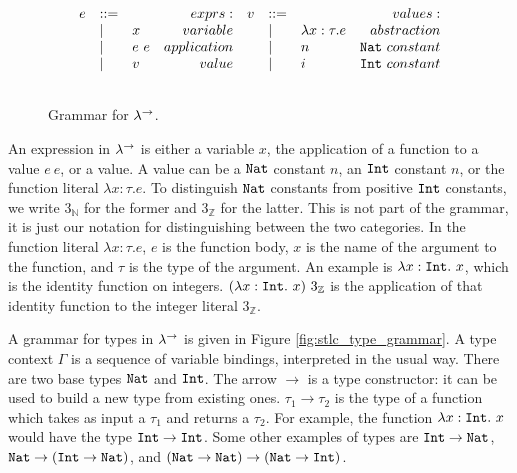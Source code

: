 \begin{figure}[h]
\vspace{-5pt}

\[
\begin{array}{lll}

\begin{array}{lllr}

e & ::= & ~ & exprs: \\
	& | & x & variable \\
	& | & e~e & application \\
	& | & v & value \\
	&&\\
	
\end{array}

\begin{array}{lllr}

v & ::= & ~ & values: \\
	& | & \lambda x: \tau . e & abstraction \\
	& | & n & \mathtt{Nat}~constant \\
	& | & i & \mathtt{Int}~constant \\
	&&\\
	
\end{array}

\end{array}
\]

\vspace{-12pt}
\caption{Grammar for $\lambda^{\rightarrow}$.}
\label{fig:stlc_grammar}
\end{figure}

An expression in $\lambda^{\rightarrow}$ is either a variable $x$, the application of a function to a value $e~e$, or a value. A value can be a $\mathtt{Nat}$ constant $n$, an $\mathtt{Int}$ constant $n$, or the function literal $\lambda x: \tau.e$. To distinguish $\mathtt{Nat}$ constants from positive $\mathtt{Int}$ constants, we write $3_{\mathbb{N}}$ for the former and $3_{\mathbb{Z}}$ for the latter. This is not part of the grammar, it is just our notation for distinguishing between the two categories. In the function literal $\lambda x: \tau.e$, $e$ is the function body, $x$ is the name of the argument to the function, and $\tau$ is the type of the argument. An example is $\lambda x: \mathtt{Int}. ~x$, which is the identity function on integers. $(\lambda x: \mathtt{Int}.~ x)~3_{\mathbb{Z}}$ is the application of that identity function to the integer literal $3_{\mathbb{Z}}$. 

A grammar for types in $\lambda^{\rightarrow}$ is given in Figure \ref{fig:stlc_type_grammar}. A type context $\Gamma$ is a sequence of variable bindings, interpreted in the usual way. There are two base types $\mathtt{Nat}$ and $\mathtt{Int}$. The arrow $\rightarrow$ is a type constructor: it can be used to build a new type from existing ones. $\tau_1 \rightarrow \tau_2$ is the type of a function which takes as input a $\tau_1$ and returns a $\tau_2$. For example, the function $\lambda x: \mathtt{Int}. ~x$ would have the type $\mathtt{Int} \rightarrow \mathtt{Int}$. Some other examples of types are $\mathtt{Int} \rightarrow \mathtt{Nat}$, $\mathtt{Nat} \rightarrow (\mathtt{Int} \rightarrow \mathtt{Nat})$, and $(\mathtt{Nat} \rightarrow \mathtt{Nat}) \rightarrow (\mathtt{Nat} \rightarrow \mathtt{Int})$.


